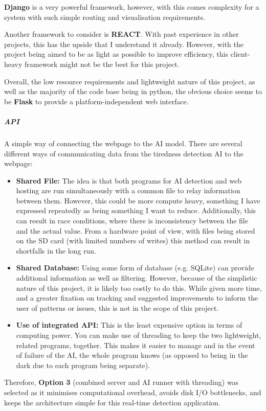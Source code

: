 \textbf{Django} is a very powerful framework, however, with this comes complexity for a system with such simple routing and visualisation
requirements.

Another framework to consider is \textbf{REACT}. With past experience in other projects, this has the upside that I understand
it already. However, with the project being aimed to be as light as possible to improve efficiency, this client-heavy framework might
not be the best for this project.

Overall, the low resource requirements and lightweight nature of this project, as well as the majority of the code base being in
python, the obvious choice seems to be \textbf{Flask} to provide a platform-independent web interface.

\subparagraph{API}
A simple way of connecting the webpage to the AI model. There are several different ways of communicating data from the tiredness
detection AI to the webpage:
\begin{itemize}
    \item \textbf{Shared File:} The idea is that both programs for AI detection and web hosting are run simultaneously with a common
    file to relay information between them. However, this could be more compute heavy, something I have expressed repeatedly as being
    something I want to reduce. Additionally, this can result in race conditions, where there is inconsistency between the file and the
    actual value. From a hardware point of view, with files being stored on the SD card (with limited numbers of writes) this method
    can result in shortfalls in the long run.
    \item \textbf{Shared Database:} Using some form of database (e.g. SQLite) can provide additional information as well as filtering.
    However, because of the simplistic nature of this project, it is likely too costly to do this. While given more time, and a greater
    fixation on tracking and suggested improvements to inform the user of patterns or issues, this is not in the scope of this project. 
    \item \textbf{Use of integrated API:} This is the least expensive option in terms of computing power. You can make use of threading
    to keep the two lightweight, related programs, together. This makes it easier to manage and in the event of failure of the AI, the
    whole program knows (as opposed to being in the dark due to each program being separate).
\end{itemize}

Therefore, \textbf{Option 3} (combined server and AI runner with threading) was selected as it minimises computational overhead, avoids
disk I/O bottlenecks, and keeps the architecture simple for this real-time detection application.